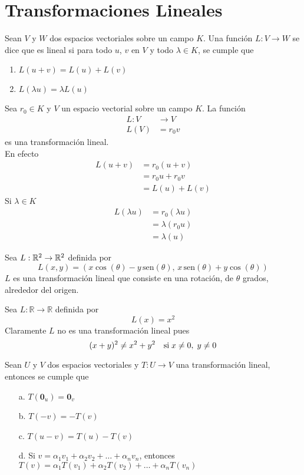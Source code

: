 \chapter{Transformaciones Lineales}

\begin{dfn}
Sean $V$ y $W$ dos espacios vectoriales sobre un campo $K$. Una función $L: V \to W$ se dice que es lineal si para todo $u$, $v$ en $V$ y todo $\lambda \in K$, se cumple que
\begin{enumerate}
\item $L (u+v) = L(u) + L(v)$
\item $L(\lambda u) = \lambda L(u)$
\end{enumerate}
\end{dfn}

\begin{ejemplo}
Sea $r_0 \in K$ y $V$ un espacio vectorial sobre un campo $K$. La función 
\begin{align*}
L: V &\to V\\
L(V) &= r_0 v
\end{align*}
es una transformación lineal.\\
En efecto 
\begin{align*}
L(u+v) &= r_0 (u+v)\\
&= r_0 u + r_0 v\\
&= L(u)+L(v)
\end{align*}
Si $\lambda \in K$
\begin{align*}
L(\lambda u) &= r_0 (\lambda u)\\
&= \lambda (r_0 u)\\
&=\lambda (u)
\end{align*}
\end{ejemplo}

\begin{ejemplo}
Sea $L: \mathbb{R}^2 \to \mathbb{R}^2$ definida por
$$L(x,y) = (x \cos(\theta) - y\, \mathrm{sen} (\theta) ,\, x\, \mathrm{sen}(\theta) + y \cos (\theta))$$
$L$ es una transformación lineal que consiste en una rotación, de $\theta$ grados, alrededor del origen.
\end{ejemplo}

\begin{ejemplo}
Sea $L: \mathbb{R} \to \mathbb{R}$ definida por 
$$L(x) = x^2$$
Claramente $L$ no es una transformación lineal pues
$$(x+y)^2 \neq x^2 + y^2  \ \ \ \textup{si} \; x\neq 0 ,\; y \neq 0$$
\end{ejemplo}

\begin{theorem}
Sean $U$ y $V$ dos espacios vectoriales y $T: U \to V$ una transformación lineal, entonces se cumple que
\begin{itemize}
\item[a. ] $T(\mathbf{0}_u) = \mathbf{0}_v$
\item[b. ] $T(-v) = -T(v)$
\item[c. ] $T(u - v) = T(u) - T(v)$
\item[d. ] Si $v = \alpha_1 v_1 + \alpha_2 v_2 + \ldots + \alpha_n v_n$, entonces $T(v) = \alpha_1 T(v_1) + \alpha_2 T(v_2) + \ldots + \alpha_n T(v_n)$
\end{itemize}
\end{theorem}

